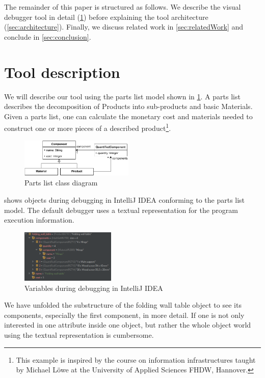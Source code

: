 \documentclass[conference]{IEEEtran}
\newcommand{\intellij}{IntelliJ IDEA}
\begin{document}
The remainder of this paper is structured as follows.
We describe the visual debugger tool in detail (\cref{sec:toolDescription}) before explaining the tool architecture (\cref{sec:architecture}).
Finally, we discuss related work in \cref{sec:relatedWork} and conclude in \cref{sec:conclusion}.

\section{Tool description} \label{sec:toolDescription}
We will describe our tool using the parts list model shown in \cref{fig:partsListModel}.
A parts list describes the decomposition of \textsf{Products} into sub-products and basic \textsf{Materials}.
Given a parts list, one can calculate the monetary cost and materials needed to construct one or more pieces of a described product\footnote{This example is inspired by the course on information infrastructures taught by Michael Löwe at the University of Applied Sciences FHDW, Hannover.}.

\begin{figure}[h]
    \centering
    \includegraphics[width=0.48\textwidth]{images/VD-partsList-classes.pdf}
    \caption{Parts list class diagram}
    \label{fig:partsListModel}
\end{figure}

 shows objects during debugging in \intellij{} conforming to the parts list model. 
The default debugger uses a textual representation for the program execution information.

\begin{figure}[h]
    \centering
    \includegraphics[width=0.4\textwidth]{images/variables.png}
    \caption{Variables during debugging in \intellij}
    \label{fig:variablesIntellij}
\end{figure}

We have unfolded the substructure of the \textsf{folding wall table} object to see its components, especially the first component, in more detail.
If one is not only interested in one attribute inside one object, but rather the whole object world using the textual representation is cumbersome.
\end{document}
